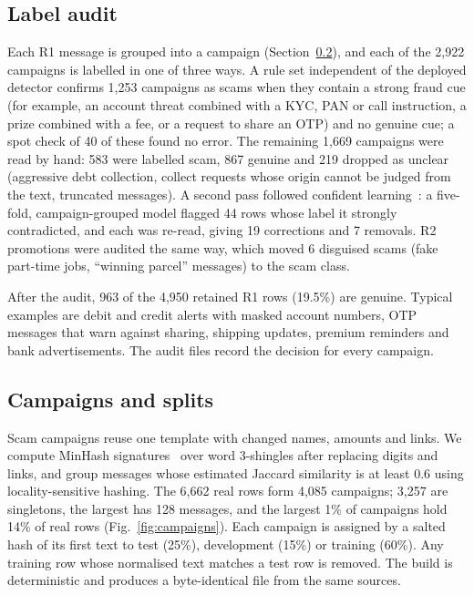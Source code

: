 \documentclass[conference]{IEEEtran}
\begin{document}
\subsection{Label audit}
Each R1 message is grouped into a campaign (Section~\ref{sec:campaigns}), and each of the 2,922 campaigns is labelled in one of three ways. A rule set independent of the deployed detector confirms 1,253 campaigns as scams when they contain a strong fraud cue (for example, an account threat combined with a KYC, PAN or call instruction, a prize combined with a fee, or a request to share an OTP) and no genuine cue; a spot check of 40 of these found no error. The remaining 1,669 campaigns were read by hand: 583 were labelled scam, 867 genuine and 219 dropped as unclear (aggressive debt collection, collect requests whose origin cannot be judged from the text, truncated messages). A second pass followed confident learning~\cite{northcutt2021confident}: a five-fold, campaign-grouped model flagged 44 rows whose label it strongly contradicted, and each was re-read, giving 19 corrections and 7 removals. R2 promotions were audited the same way, which moved 6 disguised scams (fake part-time jobs, ``winning parcel'' messages) to the scam class.

After the audit, 963 of the 4,950 retained R1 rows (19.5\%) are genuine. Typical examples are debit and credit alerts with masked account numbers, OTP messages that warn against sharing, shipping updates, premium reminders and bank advertisements. The audit files record the decision for every campaign.

\subsection{Campaigns and splits}
\label{sec:campaigns}
Scam campaigns reuse one template with changed names, amounts and links. We compute MinHash signatures~\cite{broder1997resemblance} over word 3-shingles after replacing digits and links, and group messages whose estimated Jaccard similarity is at least 0.6 using locality-sensitive hashing. The 6,662 real rows form 4,085 campaigns; 3,257 are singletons, the largest has 128 messages, and the largest 1\% of campaigns hold 14\% of real rows (Fig.~\ref{fig:campaigns}). Each campaign is assigned by a salted hash of its first text to test (25\%), development (15\%) or training (60\%). Any training row whose normalised text matches a test row is removed. The build is deterministic and produces a byte-identical file from the same sources.
\end{document}

